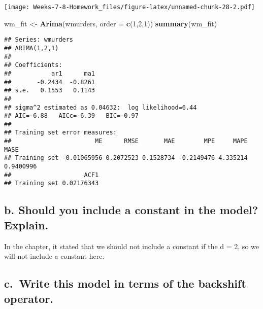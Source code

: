 \documentclass[]{article}
\newenvironment{Shaded}{\begin{snugshade}}{\end{snugshade}}
\newcommand{\DataTypeTok}[1]{\textcolor[rgb]{0.13,0.29,0.53}{#1}}
\newcommand{\DecValTok}[1]{\textcolor[rgb]{0.00,0.00,0.81}{#1}}
\newcommand{\KeywordTok}[1]{\textcolor[rgb]{0.13,0.29,0.53}{\textbf{#1}}}
\newcommand{\NormalTok}[1]{#1}
\newcommand{\OperatorTok}[1]{\textcolor[rgb]{0.81,0.36,0.00}{\textbf{#1}}}
\newcommand{\StringTok}[1]{\textcolor[rgb]{0.31,0.60,0.02}{#1}}
\begin{document}
\begin{Shaded}
\end{Shaded}

\texttt{[image: Weeks-7-8-Homework\_files/figure-latex/unnamed-chunk-28-2.pdf]}

\begin{Shaded}
\begin{Highlighting}[]
\NormalTok{wm_fit <-}\StringTok{ }\KeywordTok{Arima}\NormalTok{(wmurders, }\DataTypeTok{order =} \KeywordTok{c}\NormalTok{(}\DecValTok{1}\NormalTok{,}\DecValTok{2}\NormalTok{,}\DecValTok{1}\NormalTok{)) }
\KeywordTok{summary}\NormalTok{(wm_fit)}
\end{Highlighting}
\end{Shaded}

\begin{verbatim}
## Series: wmurders 
## ARIMA(1,2,1) 
## 
## Coefficients:
##           ar1      ma1
##       -0.2434  -0.8261
## s.e.   0.1553   0.1143
## 
## sigma^2 estimated as 0.04632:  log likelihood=6.44
## AIC=-6.88   AICc=-6.39   BIC=-0.97
## 
## Training set error measures:
##                       ME      RMSE       MAE        MPE     MAPE      MASE
## Training set -0.01065956 0.2072523 0.1528734 -0.2149476 4.335214 0.9400996
##                    ACF1
## Training set 0.02176343
\end{verbatim}

\hypertarget{b.-should-you-include-a-constant-in-the-model-explain.}{%
\subsection{b. Should you include a constant in the model?
Explain.}\label{b.-should-you-include-a-constant-in-the-model-explain.}}

In the chapter, it stated that we should not include a constant if the d
= 2, so we will not include a constant here.

\hypertarget{c.-write-this-model-in-terms-of-the-backshift-operator.}{%
\subsection{c.~Write this model in terms of the backshift
operator.}\label{c.-write-this-model-in-terms-of-the-backshift-operator.}}
\end{document}
